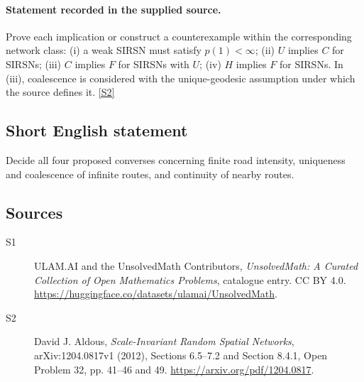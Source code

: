 \documentclass[11pt]{article}
\newcommand{\sref}[2]{\hyperlink{source:#1:#2}{[S#2]}}
\begin{document}
\paragraph{Statement recorded in the supplied source.}
Prove each implication or construct a counterexample within the corresponding network class: (i) a weak SIRSN must satisfy $p(1)<\infty$; (ii) $U$ implies $C$ for SIRSNs; (iii) $C$ implies $F$ for SIRSNs with $U$; (iv) $H$ implies $F$ for SIRSNs. In (iii), coalescence is considered with the unique-geodesic assumption under which the source defines it. \sref{statement}{2}
\subsection{Short English statement}
Decide all four proposed converses concerning finite road intensity, uniqueness and coalescence of infinite routes, and continuity of nearby routes.
\subsection{Sources}
\begin{description}
\item[\hypertarget{source:statement:1}{S1}] ULAM.AI and the UnsolvedMath Contributors, \emph{UnsolvedMath: A Curated Collection of Open Mathematics Problems}, catalogue entry. CC BY 4.0. \url{https://huggingface.co/datasets/ulamai/UnsolvedMath}.
\item[\hypertarget{source:statement:2}{S2}] David J. Aldous, \emph{Scale-Invariant Random Spatial Networks}, arXiv:1204.0817v1 (2012), Sections 6.5--7.2 and Section 8.4.1, Open Problem 32, pp. 41--46 and 49. \url{https://arxiv.org/pdf/1204.0817}.
\end{description}
\label{end:statement}
\end{document}
